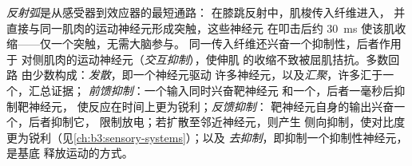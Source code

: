 \begin{definition}[基本回路]\label{def:b3:nervous-systems:circuits}
\emph{反射弧}是从感受器到效应器的最短通路：
在膝跳反射中，肌梭传入纤维进入，
并直接与同一肌肉的运动神经元形成突触，这些神经元
在叩击后约 \qty{30}{ms} 使该肌收缩——仅一个突触，无需大脑参与。
同一传入纤维还兴奋一个抑制性，后者作用于
对侧肌肉的运动神经元（\emph{交互抑制}），使伸肌
的收缩不致被屈肌拮抗。多数回路
由少数构成：\emph{发散}，即一个神经元驱动
许多神经元，以及\emph{汇聚}，许多汇于一个，汇总证据；
\emph{前馈抑制}：一个输入同时兴奋靶神经元
和一个，后者一毫秒后抑制靶神经元，
使反应在时间上更为锐利；\emph{反馈抑制}：
靶神经元自身的输出兴奋一个，后者抑制它，
限制放电；若扩散至邻近神经元，则产生
侧向抑制，使对比度更为锐利（见\cref{ch:b3:sensory-systems}）；以及
\emph{去抑制}，即抑制一个抑制性神经元，是基底
释放运动的方式。
\end{definition}

